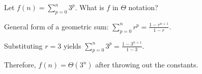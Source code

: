 \begin{prob}
    Let $f(n) = \sum_{p=0}^{n} 3^p$. What is $f$ in $\Theta$ notation?

    \begin{soln}
        General form of a geometric sum: $\sum_{p=0}^{n} r^p = \frac{1 - r^{n+1}}{1 - r}$.

        Substituting $r = 3$ yields $\sum_{p=0}^{n} 3^p = \frac{1 - 3^{n+1}}{1 - 3}$.

        Therefore, $f(n) = \Theta(3^n)$ after throwing out the constants.
    \end{soln}
\end{prob}
